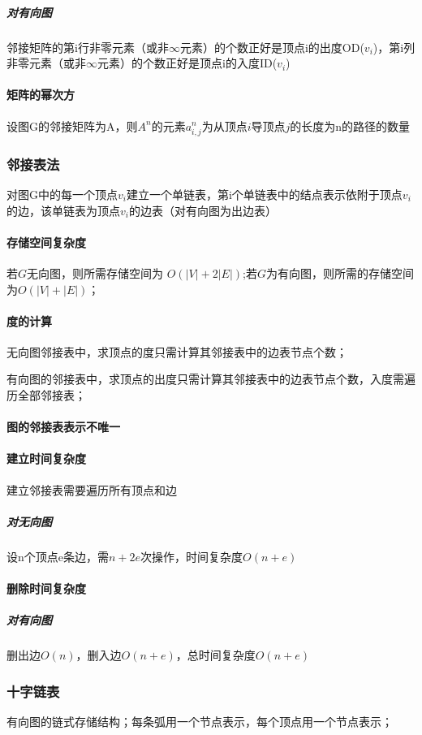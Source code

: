 \subparagraph{对有向图}
邻接矩阵的第i行非零元素（或非\(\infty\)元素）的个数正好是顶点i的出度OD(\(v_i\))，第i列非零元素（或非\(\infty\)元素）的个数正好是顶点i的入度ID(\(v_i\))

\paragraph{矩阵的幂次方}
设图G的邻接矩阵为A，则\(A^n\)的元素\(a^n_{i, j}\)为从顶点\(i\)导顶点\(j\)的长度为n的路径的数量


\subsubsection{邻接表法}
对图G中的每一个顶点\(v_i\)建立一个单链表，第i个单链表中的结点表示依附于顶点\(v_i\)的边，该单链表为顶点\(v_i\)的边表（对有向图为出边表）


\paragraph{存储空间复杂度}
若\(G\)无向图，则所需存储空间为 \(O(|V| + 2|E|)\);若\(G\)为有向图，则所需的存储空间为\(O(|V| + |E|)\)；

\paragraph{度的计算}
无向图邻接表中，求顶点的度只需计算其邻接表中的边表节点个数；

有向图的邻接表中，求顶点的出度只需计算其邻接表中的边表节点个数，入度需遍历全部邻接表；

\paragraph{图的邻接表表示不唯一}

\paragraph{建立时间复杂度}
建立邻接表需要遍历所有顶点和边
\subparagraph{对无向图}
设n个顶点e条边，需\(n + 2e\)次操作，时间复杂度\(O(n + e)\)

\paragraph{删除时间复杂度}
\subparagraph{对有向图}
删出边\(O(n)\)，删入边\(O(n + e)\)，总时间复杂度\(O(n + e)\)



\subsubsection{十字链表}
有向图的链式存储结构；每条弧用一个节点表示，每个顶点用一个节点表示；

